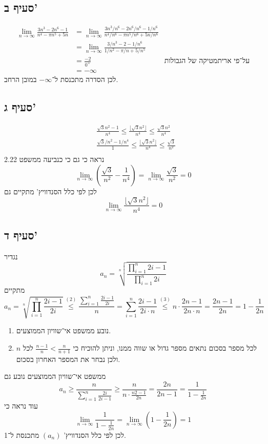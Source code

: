 \subsection{סעיף ב'}
\begin{align*}
	\lim_{n \to \infty} \frac{3n^3 - 2n^6 - 1}{n^4 - \pi n^5 + 5n}
	& = \lim_{n \to \infty} \frac{3n^3/n^6 - 2n^6/n^6 - 1/n^6}{n^4/n^6 - \pi n^5/n^6 + 5n/n^6} \\
	& = \lim_{n \to \infty} \frac{3/n^3 - 2 - 1/n^6}{1/n^2 - \pi /n + 5/n^5} \\
	& = \frac{-2}{0^+} & \text{על־פי אריתמטיקה של הגבולות} \\
	& = -\infty
\end{align*}
לכן הסדרה מתכנסת ל־$-\infty$ במובן הרחב.

\subsection{סעיף ג'}
\begin{align*}
	& \frac{\sqrt{3} n^2 - 1}{n^4} \le \frac{\lfloor \sqrt{3} n^2 \rfloor}{n^4} \le \frac{\sqrt{3} n^2}{n^4} \\
	& \frac{\sqrt{3}/n^2 - 1/n^4}{1} \le \frac{\lfloor \sqrt{3} n^2 \rfloor}{n^4} \le \frac{\sqrt{3}}{n^2} \\
\end{align*}
נראה כי גם כי כנביעה ממשפט 2.22
\[
	\lim_{n \to \infty} \left(\frac{\sqrt{3}}{n^2} - \frac{1}{n^4} \right)
	=
	\lim_{n \to \infty} \frac{\sqrt{3}}{n^2}
	= 0
\]
לכן לפי כלל הסנדוויץ' מתקיים גם
\[
	\lim_{n \to \infty} \frac{\lfloor \sqrt{3} n^2 \rfloor}{n^4} = 0
\]

\subsection{סעיף ד'}
נגדיר
\[
	a_n = \sqrt[n]{\frac{\displaystyle \prod_{i = 1}^{n} 2i - 1}{\displaystyle \prod_{i = 1}^{n} 2i }}
\]
מתקיים
\[
	a_n
	= \sqrt[n]{\displaystyle \prod_{i = 1}^{n} \frac{2i - 1}{2i}}
	\overset{(2)}{\le} \frac{\displaystyle \sum_{i = 1}^{n} \frac{2i - 1}{2i}}{n}
	= \displaystyle \sum_{i = 1}^{n} \frac{2i - 1}{2i \cdot n}
	\overset{(3)}{\le} \displaystyle n \cdot \frac{2n - 1}{2n \cdot n}
	= \frac{2n - 1}{2n} 
	= 1 - \frac{1}{2n} 
\]
\begin{enumerate}[(1)]
	\item נובע ממשפט אי־שוויון הממוצעים.
	\item לכל מספר בסכום נתאים מספר גדול או שווה ממנו, וניתן להוכיח כי $\frac{n - 1}{n} < \frac{n}{n + 1}$ לכל $n$ ולכן נבחר את המספר האחרון בסכום.
\end{enumerate}
ממשפט אי־שוויון הממוצעים נובע גם
\[
	a_n
	\ge \frac{n}{\sum_{i = 1}^n \frac{2i}{2i - 1}}
	\ge \frac{n}{n \cdot \frac{n2 - 1}{2n}}
	= \frac{2n}{2n - 1}
	= \frac{1}{1 - \frac{1}{2n}}
\]
עוד נראה כי
\[
	\lim_{n \to \infty} \frac{1}{1 - \frac{1}{2n}} = \lim_{n \to \infty} \left( 1 - \frac{1}{2n} \right) = 1
\]
לכן לפי כלל הסנדוויץ' $(a_n)$ מתכנסת ל־1.

